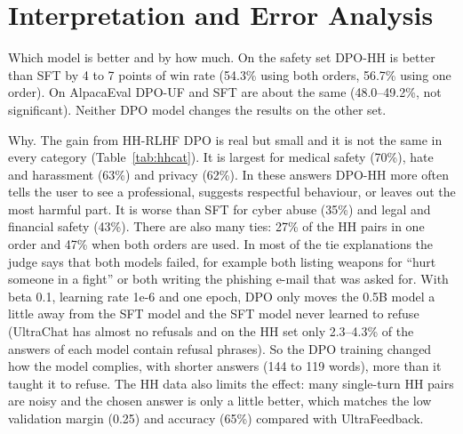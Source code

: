 \documentclass[11pt,a4paper]{article}
\begin{document}
\section{Interpretation and Error Analysis}

Which model is better and by how much. On the safety set DPO-HH is better than SFT by 4 to 7 points of win rate (54.3\% using both orders,
56.7\% using one order). On AlpacaEval DPO-UF and SFT are about the same (48.0--49.2\%, not significant). Neither DPO model changes the results on
the other set.

Why. The gain from HH-RLHF DPO is real but small and it is not the same in every category (Table~\ref{tab:hhcat}). It is largest for medical
safety (70\%), hate and harassment (63\%) and privacy (62\%). In these answers DPO-HH more often tells the user to see a professional, suggests
respectful behaviour, or leaves out the most harmful part. It is worse than SFT for cyber abuse (35\%) and legal and financial safety (43\%).
There are also many ties: 27\% of the HH pairs in one order and 47\% when both orders are used. In most of the tie explanations the judge says
that both models failed, for example both listing weapons for ``hurt someone in a fight'' or both writing the phishing e-mail that was asked
for. With beta 0.1, learning rate 1e-6 and one epoch, DPO only moves the 0.5B model a little away from the SFT model and the SFT model never
learned to refuse (UltraChat has almost no refusals and on the HH set only 2.3--4.3\% of the answers of each model contain refusal phrases). So the
DPO training changed how the model complies, with shorter answers (144 to 119 words), more than it taught it to
refuse. The HH data also limits the effect: many single-turn HH pairs are noisy and the chosen answer is only a little better, which matches the
low validation margin (0.25) and accuracy (65\%) compared with UltraFeedback.
\end{document}
